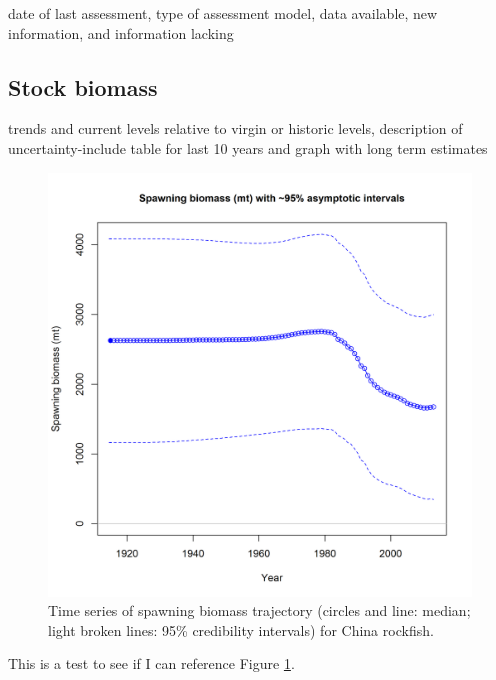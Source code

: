 \documentclass[12pt,]{article}
\begin{document}
date of last assessment, type of assessment model, data available, new
information, and information lacking

\subsection*{Stock biomass}\label{stock-biomass}

trends and current levels relative to virgin or historic levels,
description of uncertainty-include table for last 10 years and graph
with long term estimates

\begin{figure}[htbp]
\centering
\includegraphics{plots/spawningB.png}
\caption{Time series of spawning biomass trajectory (circles and line:
median; light broken lines: 95\% credibility intervals) for China
rockfish. \label{spawningB}}
\end{figure}

This is a test to see if I can reference Figure \ref{spawningB}.
\end{document}

